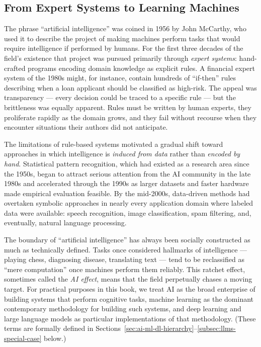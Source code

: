 \subsection{From Expert Systems to Learning Machines}
\label{subsec:expert-to-learning}

The phrase ``artificial intelligence'' was coined in 1956 by John McCarthy,
who used it to describe the project of making machines perform tasks that
would require intelligence if performed by humans.  For the first three
decades of the field's existence that project was pursued primarily through
\emph{expert systems}: hand-crafted programs encoding domain knowledge as
explicit rules.  A financial expert system of the 1980s might, for instance,
contain hundreds of ``if-then'' rules describing when a loan applicant should
be classified as high-risk.  The appeal was transparency --- every decision
could be traced to a specific rule --- but the brittleness was equally
apparent.  Rules must be written by human experts, they proliferate rapidly
as the domain grows, and they fail without recourse when they encounter
situations their authors did not anticipate.

The limitations of rule-based systems motivated a gradual shift toward
approaches in which intelligence is \emph{induced from data} rather than
\emph{encoded by hand}.  Statistical pattern recognition, which had existed
as a research area since the 1950s, began to attract serious attention from
the AI community in the late 1980s and accelerated through the 1990s as
larger datasets and faster hardware made empirical evaluation feasible.  By
the mid-2000s, data-driven methods had overtaken symbolic approaches in
nearly every application domain where labeled data were available: speech
recognition, image classification, spam filtering, and, eventually, natural
language processing.

\begin{remark}
\label{rem:ai-definition-shift}
The boundary of ``artificial intelligence'' has always been socially
constructed as much as technically defined.  Tasks once considered hallmarks
of intelligence --- playing chess, diagnosing disease, translating text ---
tend to be reclassified as ``mere computation'' once machines perform them
reliably.  This ratchet effect, sometimes called the \emph{AI effect}, means
that the field perpetually chases a moving target.  For practical purposes
in this book, we treat AI as the broad enterprise of building systems that
perform cognitive tasks, machine learning as the dominant contemporary
methodology for building such systems, and deep learning and large language
models as particular implementations of that methodology.
(These terms are formally defined in Sections~\ref{sec:ai-ml-dl-hierarchy}--\ref{subsec:llms-special-case} below.)
\end{remark}

